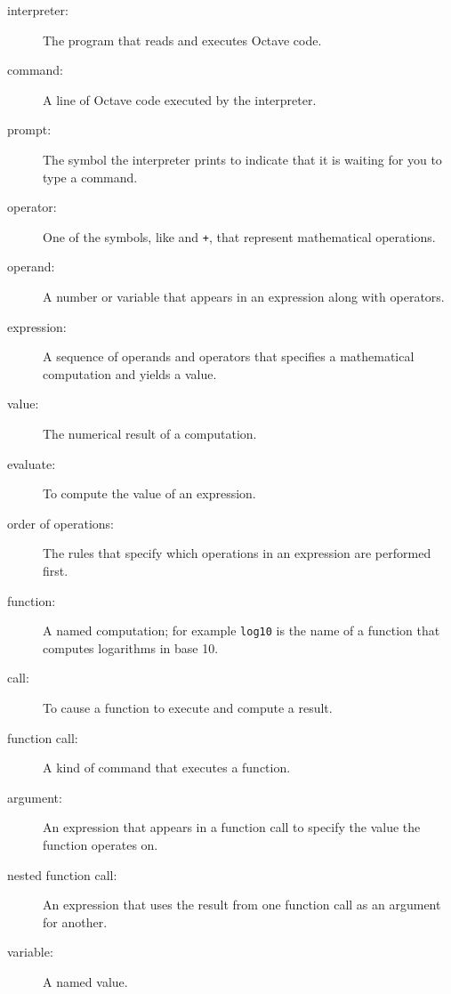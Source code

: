 \documentclass{book}
\begin{document}
\begin{description}

\item[interpreter:] The program that reads and executes Octave code.

\item[command:] A line of Octave code executed by the interpreter.

\item[prompt:] The symbol the interpreter prints to indicate that it is
waiting for you to type a command.

\item[operator:] One of the symbols, like {\tt *} and {\tt +}, that
represent mathematical operations.  

\item[operand:] A number or variable that appears in an expression along
with operators.

\item[expression:] A sequence of operands and operators that specifies
a mathematical computation and yields a value.  

\item[value:] The numerical result of a computation.  

\item[evaluate:] To compute the value of an expression.  

\item[order of operations:] The rules that specify which operations
in an expression are performed first.

\item[function:] A named computation; for example {\tt log10} is the
name of a function that computes logarithms in base 10.

\item[call:] To cause a function to execute and compute a result.  

\item[function call:] A kind of command that executes a function.  

\item[argument:] An expression that appears in a function call to
specify the value the function operates on.

\item[nested function call:] An expression that uses the result from
one function call as an argument for another.  

\item[variable:] A named value.  


\end{description}
\end{document}
